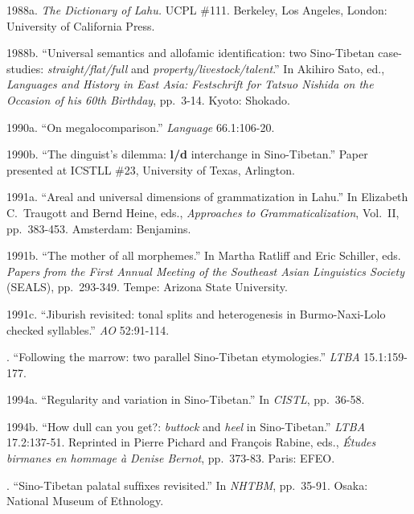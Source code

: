 \rrefline %
1988a.
\textit{The Dictionary of Lahu.}
UCPL \#111.  Berkeley, Los Angeles, London: University of California Press.

\rrefline %
1988b.
“Universal semantics and allofamic identiﬁcation: two Sino-Tibetan case-studies: \textit{straight/ﬂat/full} and \textit{property/livestock/talent}.”
In Akihiro Sato, ed., \textit{Languages and History in East Asia: Festschrift for Tatsuo Nishida on the Occasion of his 60th Birthday}, pp.\ 3-14. Kyoto: Shokado.

\rrefline %
1990a.
“On megalocomparison.”
\textit{Language} 66.1:106-20.

\rrefline %
1990b.
“The dinguist’s dilemma: \textbf{l/d} interchange in Sino-Tibetan.”
Paper presented at ICSTLL \#23, University of Texas, Arlington.

\rrefline %
1991a.
“Areal and universal dimensions of grammatization in Lahu.”
In Elizabeth C.\ Traugott and Bernd Heine, eds., \textit{Approaches to Grammaticalization}, Vol.~II, pp.\ 383-453. Amsterdam: Benjamins.

\rrefline %
1991b.
“The mother of all morphemes.”
In Martha Ratliff and Eric Schiller, eds. \textit{Papers from the First Annual Meeting of the Southeast Asian Linguistics Society} (SEALS), pp.\ 293-349. Tempe: Arizona State University.

\rrefline %
1991c.
“Jiburish revisited: tonal splits and heterogenesis in Burmo-Naxi-Lolo checked syllables.”
\textit{AO} 52:91-114.

.
“Following the marrow: two parallel Sino-Tibetan etymologies.”
\textit{LTBA} 15.1:159-177.

\rrefline %
1994a.
“Regularity and variation in Sino-Tibetan.”
In \textit{CISTL}, pp.\ 36-58.

\rrefline %
1994b.
“How dull can you get?: \textit{buttock} and \textit{heel} in Sino-Tibetan.”
\textit{LTBA} 17.2:137-51. Reprinted in Pierre Pichard and François Rabine, eds., \textit{Études birmanes en hommage à Denise Bernot}, pp.\ 373-83. Paris: EFEO.

.
“Sino-Tibetan palatal sufﬁxes revisited.”
In \textit{NHTBM}, pp.\ 35-91. Osaka: National Museum of Ethnology.

